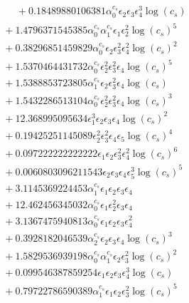 \documentclass[10pt]{article}
\begin{document}
\begin{align*}
\phantom{F_{s,6}} &\phantom{={}}{}  + 0.18489880106381 \alpha_{0}^{c_s} \epsilon_{2} \epsilon_{3} \epsilon_{4}^{3} \log{\left(c_{s} \right)} \\
&{}  + 1.4796371545385 \alpha_{0}^{c_s} \alpha_{1}^{c_s} \epsilon_{1} \epsilon_{2}^{2} \log{\left(c_{s} \right)}^{5} \\
&{}  + 0.38296851459829 \alpha_{0}^{c_s} \epsilon_{2} \epsilon_{3}^{2} \epsilon_{4}^{2} \log{\left(c_{s} \right)}^{2} \\
&{}  + 1.5370464431732 \alpha_{0}^{c_s} \epsilon_{2}^{2} \epsilon_{3}^{2} \epsilon_{4} \log{\left(c_{s} \right)}^{5} \\
&{}  + 1.5388853723805 \alpha_{1}^{c_s} \epsilon_{2} \epsilon_{3}^{2} \epsilon_{4} \log{\left(c_{s} \right)} \\
&{}  + 1.5432286513104 \alpha_{0}^{c_s} \epsilon_{2}^{2} \epsilon_{3}^{2} \epsilon_{4} \log{\left(c_{s} \right)}^{3} \\
&{}  + 12.368995095634 \epsilon_{1}^{3} \epsilon_{2} \epsilon_{3} \epsilon_{4} \log{\left(c_{s} \right)}^{2} \\
&{}  + 0.19425251145089 \epsilon_{2}^{2} \epsilon_{3}^{2} \epsilon_{4} \epsilon_{5} \log{\left(c_{s} \right)}^{4} \\
&{}  + 0.097222222222222 \epsilon_{1} \epsilon_{2} \epsilon_{3}^{2} \epsilon_{4}^{2} \log{\left(c_{s} \right)}^{6} \\
&{}  + 0.0060803096211543 \epsilon_{2} \epsilon_{3} \epsilon_{4} \epsilon_{5}^{3} \log{\left(c_{s} \right)}^{5} \\
&{}  + 3.1145369224453 \alpha_{1}^{c_s} \epsilon_{1} \epsilon_{2} \epsilon_{3} \epsilon_{4} \\
&{}  + 12.462456345032 \alpha_{0}^{c_s} \epsilon_{1} \epsilon_{2}^{2} \epsilon_{3} \epsilon_{4} \\
&{}  + 3.1367475940813 \alpha_{0}^{c_s} \epsilon_{1} \epsilon_{2} \epsilon_{3} \epsilon_{4}^{2} \\
&{}  + 0.3928182046539 \alpha_{2}^{c_s} \epsilon_{2} \epsilon_{3} \epsilon_{4} \log{\left(c_{s} \right)}^{3} \\
&{}  + 1.5829536939198 \alpha_{0}^{c_s} \alpha_{1}^{c_s} \epsilon_{2} \epsilon_{3}^{2} \log{\left(c_{s} \right)}^{2} \\
&{}  + 0.099546387859254 \epsilon_{1} \epsilon_{2} \epsilon_{3} \epsilon_{4}^{3} \log{\left(c_{s} \right)} \\
&{}  + 0.79722786590389 \alpha_{1}^{c_s} \epsilon_{1} \epsilon_{2} \epsilon_{3}^{2} \log{\left(c_{s} \right)}^{5} \\

\end{align*}
\end{document}
